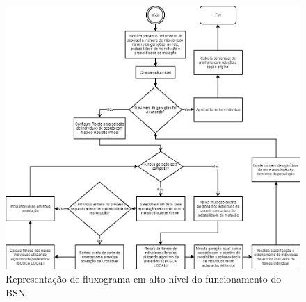 \begin{figure} [t]%
	\centering
	\includegraphics[width=1\textwidth]{./figuras/BSN-Flow.png}
	\caption[Fluxograma do BSN]{Representação de fluxograma em alto nível do funcionamento do BSN}
	\label{fig_bsn_flow}
\end{figure}

